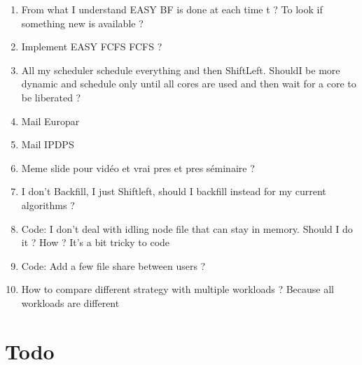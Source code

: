 \documentclass[a4paper]{article}
\begin{document}
	\begin{enumerate}
		\item From what I understand EASY BF is done at each time t ? To look if something new is available ?
		\item Implement EASY FCFS FCFS ?
		\item All my scheduler schedule everything and then ShiftLeft. ShouldI be more dynamic and schedule only until all cores are used and then wait for a core to be liberated ?
		\item Mail Europar
		\item Mail IPDPS
		\item Meme slide pour vidéo et vrai pres et pres séminaire ?
		\item I don't Backfill, I just Shiftleft, should I backfill instead for my current algorithms ?
		\item Code: I don't deal with idling node file that can stay in memory. Should I do it ? How ? It's a bit tricky to code
		\item Code: Add a few file share between users ?
		\item How to compare different strategy with multiple workloads ? Because all workloads are different
	\end{enumerate}

\section{Todo}
\end{document}
